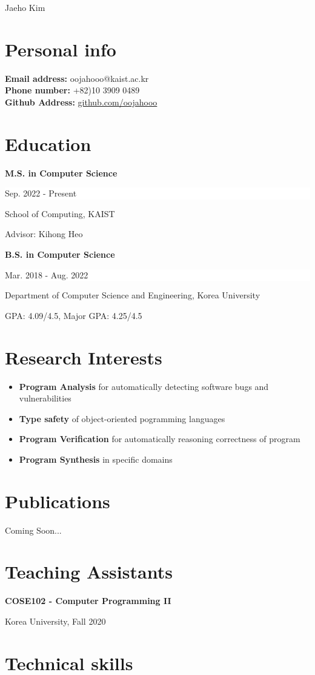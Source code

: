 \documentclass[paper=a4,fontsize=11pt]{scrartcl} %
\newcommand{\MyName}[1]{ %
                \Huge \hfill #1
                \par \normalsize \normalfont}
\newcommand{\NewPart}[1]{\section*{{#1}}}
\newcommand{\EducationEntry}[4]{
		\noindent \textbf{#1} \hfill      %
		\colorbox{White}{%
			\parbox{5cm}{%
			\hfill\color{Black}#2}} \par  %
		\noindent #3 \par        %
		\noindent\small #4 %
		\normalsize \par}
\begin{document}

\MyName{Jaeho Kim}



\NewPart{Personal info}{}
\textbf{Email address:} oojahooo@kaist.ac.kr \\
\textbf{Phone number:} +82)10 3909 0489  \\
\textbf{Github Address:} \href{https://github.com/oojahooo}{github.com/oojahooo}

\NewPart{Education}{}

\EducationEntry{M.S. in Computer Science}{Sep. 2022 - Present}{School of Computing, KAIST}{
	Advisor: Kihong Heo
}

\EducationEntry{B.S. in Computer Science}{Mar. 2018 - Aug. 2022}{Department of Computer Science and Engineering, Korea University}{
	GPA: 4.09/4.5, Major GPA: 4.25/4.5 \\
}


\NewPart{Research Interests}{}

\begin{itemize}
	\item \textbf{Program Analysis} for automatically detecting software bugs and vulnerabilities
	\item \textbf{Type safety} of object-oriented pogramming languages
	\item \textbf{Program Verification} for automatically reasoning correctness of program
	\item \textbf{Program Synthesis} in specific domains
\end{itemize}


\NewPart{Publications}{}

Coming Soon...

\newpage

\NewPart{Teaching Assistants}{}

\EducationEntry{COSE102 - Computer Programming II}{}{Korea University, Fall 2020}{}


\NewPart{Technical skills}{}
\end{document}
